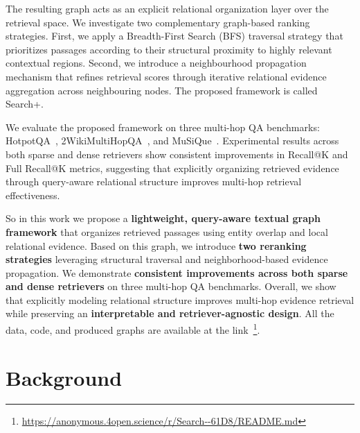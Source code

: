 \documentclass[11pt]{article}
\begin{document}
The resulting graph acts as an explicit relational organization layer over the retrieval space. We investigate two complementary graph-based ranking strategies. First, we apply a Breadth-First Search (BFS) traversal strategy that prioritizes passages according to their structural proximity to highly relevant contextual regions. Second, we introduce a neighbourhood propagation mechanism that refines retrieval scores through iterative relational evidence aggregation across neighbouring nodes. The proposed framework is called Search+.





We evaluate the proposed framework on three multi-hop QA benchmarks: HotpotQA~\cite{yang-etal-2018-hotpotqa}, 2WikiMultiHopQA~\cite{ho-etal-2020-constructing}, and MuSiQue~\cite{trivedi-etal-2022-musique}. Experimental results across both sparse and dense retrievers show consistent improvements in Recall@K and Full Recall@K metrics, suggesting that explicitly organizing retrieved evidence through query-aware relational structure improves multi-hop retrieval effectiveness.

So in this work we propose a \textbf{lightweight, query-aware textual graph framework} that organizes retrieved passages using entity overlap and local relational evidence. Based on this graph, we introduce \textbf{two reranking strategies} leveraging structural traversal and neighborhood-based evidence propagation. We demonstrate \textbf{consistent improvements across both sparse and dense retrievers} on three multi-hop QA benchmarks. Overall, we show that explicitly modeling relational structure improves multi-hop evidence retrieval while preserving an \textbf{interpretable and retriever-agnostic design}. All the data, code, and produced graphs are available at the link~\footnote{\url{https://anonymous.4open.science/r/Search--61D8/README.md}}.



\section{Background}\label{background}
\end{document}
